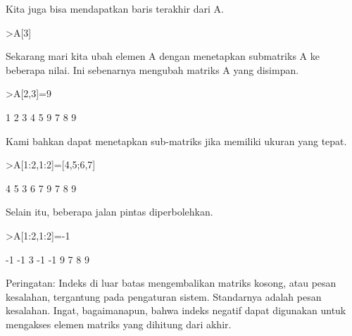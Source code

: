\documentclass[a4paper,10pt]{article}
\begin{document}
\begin{eulernotebook}
\begin{eulercomment}
\begin{eulercomment}
\begin{eulercomment}
\begin{eulercomment}
\begin{eulercomment}
Kita juga bisa mendapatkan baris terakhir dari A.
\end{eulercomment}
\begin{eulerprompt}
>A[3]
\end{eulerprompt}
\begin{euleroutput}
  [7,  8,  9]
\end{euleroutput}
\begin{eulercomment}
Sekarang mari kita ubah elemen A dengan menetapkan submatriks A ke
beberapa nilai. Ini sebenarnya mengubah matriks A yang disimpan.
\end{eulercomment}
\begin{eulerprompt}
>A[2,3]=9
\end{eulerprompt}
\begin{euleroutput}
              1             2             3 
              4             5             9 
              7             8             9 
\end{euleroutput}
\begin{eulercomment}
Kami bahkan dapat menetapkan sub-matriks jika memiliki ukuran yang
tepat.
\end{eulercomment}
\begin{eulerprompt}
>A[1:2,1:2]=[4,5;6,7]
\end{eulerprompt}
\begin{euleroutput}
              4             5             3 
              6             7             9 
              7             8             9 
\end{euleroutput}
\begin{eulercomment}
Selain itu, beberapa jalan pintas diperbolehkan.
\end{eulercomment}
\begin{eulerprompt}
>A[1:2,1:2]=-1
\end{eulerprompt}
\begin{euleroutput}
             -1            -1             3 
             -1            -1             9 
              7             8             9 
\end{euleroutput}
\begin{eulercomment}
Peringatan: Indeks di luar batas mengembalikan matriks kosong, atau
pesan kesalahan, tergantung pada pengaturan sistem. Standarnya adalah
pesan kesalahan. Ingat, bagaimanapun, bahwa indeks negatif dapat
digunakan untuk mengakses elemen matriks yang dihitung dari akhir.
\end{eulercomment}
\begin{eulerprompt}

\end{eulerprompt}
\end{eulercomment}
\end{eulercomment}
\end{eulercomment}
\end{eulercomment}
\end{eulernotebook}
\end{document}

